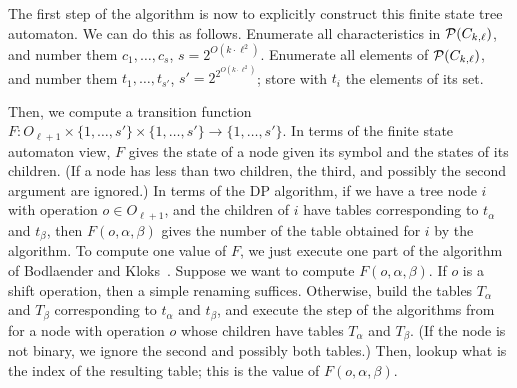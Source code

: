\documentclass[a4paper,11pt]{article}
\theoremstyle{definition}
\theoremstyle{remark}
\begin{document}
The first step of the algorithm is now to explicitly construct this
finite state tree automaton.  We can do this as follows.  Enumerate
all characteristics in ${\cal P}(C_{k,\ell})$, and number them $c_1,
\ldots, c_s$, $s = 2^{O(k \cdot \ell^2)}$.  Enumerate all elements of
${\cal P}(C_{k,\ell})$, and number them $t_1, \ldots, t_{s'}$, $s' =
2^{2^{O(k \cdot \ell^2)}}$; store with $t_i$ the elements of its set.

Then, we compute a transition function $F: O_{\ell+1} \times \{1, \ldots,
s'\} \times \{1, \ldots, s'\} \rightarrow \{1, \ldots, s'\}$.  In
terms of the finite state automaton view, $F$ gives the state of a
node given its symbol and the states of its children.  (If a node has
less than two children, the third, and possibly the second argument
are ignored.) In terms of the DP algorithm, if we have a tree node $i$
with operation $o \in O_{\ell+1}$, and the children of $i$ have tables
corresponding to $t_\alpha$ and $t_\beta$, then $F(o,\alpha,\beta)$
gives the number of the table obtained for $i$ by the algorithm.  To
compute one value of $F$, we just execute one part of the algorithm of
Bodlaender and Kloks~\cite{BodlaenderK96}.  Suppose we want to compute
$F(o,\alpha,\beta)$.  If $o$ is a shift operation, then a simple
renaming suffices.  Otherwise, build the tables $T_\alpha$ and
$T_\beta$ corresponding to $t_\alpha$ and $t_\beta$, and execute the
step of the algorithms from~\cite{BodlaenderK96} for a node with
operation $o$ whose children have tables $T_\alpha$ and $T_\beta$.
(If the node is not binary, we ignore the second and possibly both
tables.)  Then, lookup what is the index of the resulting table; this
is the value of $F(o,\alpha,\beta)$.
\end{document}
